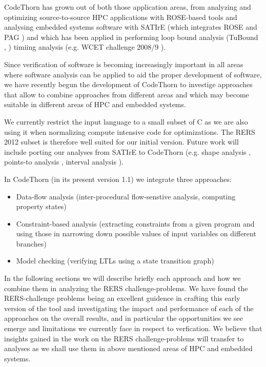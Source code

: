 \documentclass[natbib]{article}
\begin{document}
CodeThorn has grown out of both those application areas, from
analyzing and optimizing source-to-source HPC applications \cite{MS-QSMK04CPA} with
ROSE-based tools \cite{ROSEWEBSITE,MS-SCAM05} and analysing embedded systems
software with SATIrE (which integrates ROSE and PAG \cite{PAG}) and
which has been applied in performing loop bound analysis (TuBound \cite{Prantl:SK08}, \cite{Kirner:SOSYM2010}) timiing
analysis (e.g. WCET challenge 2008/9 \cite{Prantl:WCET2009}).

Since verification of software is becoming increasingly important in
all areas where software analysis can be applied to aid the proper
development of software, we have recently begun the development of
CodeThorn to investige approaches that allow to combine approaches
from different areas and which may become suitable in different areas
of HPC and embedded systems.

We currently restrict the input language to a small subset of C as we
are also using it when normalizing compute intensive code for
optimizations. The RERS 2012 subset is therefore well suited for our
initial version. Future work will include porting our analyses from
SATIrE to CodeThorn (e.g. shape analysis \cite{shapeanalysis},
points-to analysis \cite{pointstoanalysis}, interval analysis \cite{intervalanalysis}).

In CodeThorn (in its present version 1.1) we integrate three approaches:

\begin{itemize}
\item Data-flow analysis (inter-procedural flow-senstive analysis, computing property states) 
\item Constraint-based analysis (extracting constraints from a given program and using those in narrowing down possible values of input variables on different branches)
\item Model checking (verifying LTLs using a state transition graph)
\end{itemize}

In the following sections we will describe briefly each approach and
how we combine them in analyzing the RERS challenge-problems. We have
found the RERS-challenge problems being an excellent guidence in
crafting this early version of the tool and investigating the impact
and performance of each of the approaches on the overall results, and
in particular the opportunities we see emerge and limitations we
currently face in respect to verfication. We believe that insights
gained in the work on the RERS challenge-problems will transfer to
analyses as we shall use them in above mentioned areas of HPC and
embedded systems.






\end{document}
